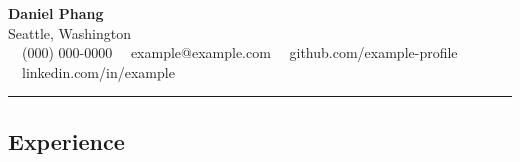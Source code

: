 \documentclass[11pt,letterpaper]{article}
\begin{document}
\begin{center}
	{\LARGE \textbf{Daniel Phang}}\\
	Seattle, Washington
	\vspace{0.05cm}
	\\
	\raisebox{-0.2\height} {\Large \faPhoneSquare} \ \  (000) 000-0000 \hfill\raisebox{-0.2\height}{\Large \faEnvelopeSquare} \ \ example@example.com \hfill \raisebox{-0.2\height}{\Large \faGithubSquare} \ \ github.com/example-profile \hfill \raisebox{-0.2\height}{\Large \faLinkedinSquare} \ \ linkedin.com/in/example
\end{center}

\hrule
\vspace{-1em}
\subsection*{\Large Experience}
\end{document}
